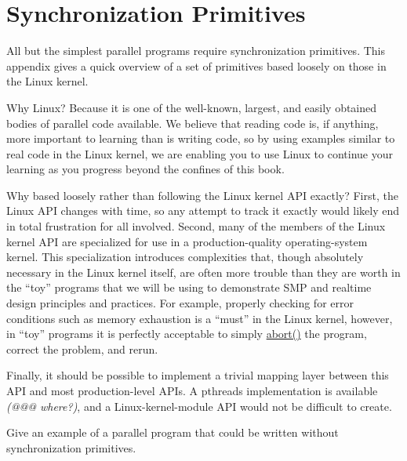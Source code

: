 
\chapter{Synchronization Primitives}
\label{app:primitives:Synchronization Primitives}


All but the simplest parallel programs require synchronization
primitives.
This appendix gives a quick overview of a set of primitives based
loosely on those in the Linux kernel.

Why Linux?
Because it is one of the well-known, largest, and easily obtained
bodies of parallel code available.
We believe that reading code is, if anything, more important to learning
than is writing code, so by using examples similar to real code in
the Linux kernel, we are enabling you to use Linux to continue your
learning as you progress beyond the confines of this book.

Why based loosely rather than following the Linux kernel API exactly?
First, the Linux API changes with time, so any attempt to track it
exactly would likely end in total frustration for all involved.
Second, many of the members of the Linux kernel API are specialized for
use in a production-quality operating-system kernel.
This specialization introduces complexities that, though absolutely
necessary in the Linux kernel itself, are often more trouble than they are
worth in the ``toy'' programs that we will be using to demonstrate
SMP and realtime design principles and practices.
For example, properly checking for error conditions such as memory
exhaustion is a ``must'' in the Linux kernel, however, in ``toy'' programs
it is perfectly acceptable to simply \url{abort()} the program,
correct the problem, and rerun.

Finally, it should be possible to implement a trivial mapping layer between
this API and most production-level APIs.
A pthreads implementation is available \emph{(@@@ where?)}, and
a Linux-kernel-module API would not be difficult to create.

\QuickQuiz{}
	Give an example of a parallel program that could be written
	without synchronization primitives.
 \QuickQuizEnd

